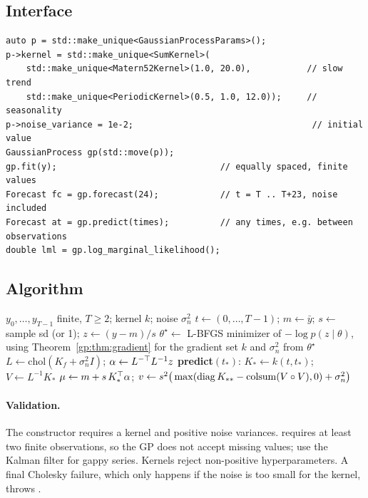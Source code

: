 \subsection{Interface}
\begin{lstlisting}
auto p = std::make_unique<GaussianProcessParams>();
p->kernel = std::make_unique<SumKernel>(
    std::make_unique<Matern52Kernel>(1.0, 20.0),           // slow trend
    std::make_unique<PeriodicKernel>(0.5, 1.0, 12.0));     // seasonality
p->noise_variance = 1e-2;                                   // initial value
GaussianProcess gp(std::move(p));
gp.fit(y);                                // equally spaced, finite values
Forecast fc = gp.forecast(24);            // t = T .. T+23, noise included
Forecast at = gp.predict(times);          // any times, e.g. between observations
double lml = gp.log_marginal_likelihood();
\end{lstlisting}

\subsection{Algorithm}
\begin{algorithm}[ht]
\caption{ and }\label{gp:alg:gp}
\begin{algorithmic}[1]
\Require $y_0,\dots,y_{T-1}$ finite, $T\ge2$; kernel $k$; noise $\sigma_n^2$
\State $t\gets(0,\dots,T-1)$;\; $m\gets\bar y$;\; $s\gets$ sample sd (or 1);\; $z\gets(y-m)/s$
  \State $\theta^\star\gets$ L-BFGS minimizer of $-\log p(z\mid\theta)$, using Theorem~\ref{gp:thm:gradient} for the gradient
  \State set $k$ and $\sigma_n^2$ from $\theta^\star$
\EndIf
\State $L\gets\mathrm{chol}(K_f+\sigma_n^2I)$;\; $\alpha\gets L^{-\top}L^{-1}z$ 
\Statex \textbf{predict}$(t_*)$:
\State $K_*\gets k(t,t_*)$;\; $V\gets L^{-1}K_*$
\State $\mu\gets m+s\,K_*^\top\alpha$;\; $v\gets s^2\big(\max(\operatorname{diag} K_{**}-\mathrm{colsum}(V\circ V),0)+\sigma_n^2\big)$
\end{algorithmic}
\end{algorithm}

\paragraph{Validation.} The constructor requires a kernel and positive noise
variances.  requires at least two finite observations, so the GP does not
accept missing values; use the Kalman filter for gappy series. Kernels
reject non-positive hyperparameters. A final Cholesky failure, which only happens if the
noise is too small for the kernel, throws .

